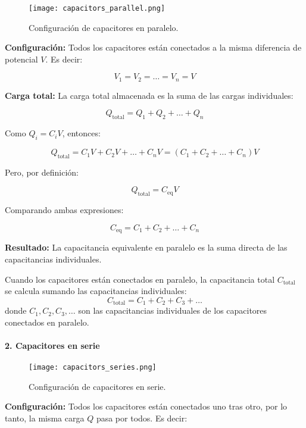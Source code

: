 \begin{figure}[ht]
    \centering
    \texttt{[image: capacitors\_parallel.png]}
    \caption{Configuración de capacitores en paralelo.}
    \label{fig:capacitors_parallel}    
\end{figure}

\textbf{Configuración:} Todos los capacitores están conectados a la misma diferencia de potencial \( V \). Es decir:

\[
V_1 = V_2 = \dots = V_n = V
\]

\textbf{Carga total:} La carga total almacenada es la suma de las cargas individuales:

\[
Q_{\text{total}} = Q_1 + Q_2 + \dots + Q_n
\]

Como \( Q_i = C_i V \), entonces:

\[
Q_{\text{total}} = C_1 V + C_2 V + \dots + C_n V = \left( C_1 + C_2 + \dots + C_n \right) V
\]

Pero, por definición:

\[
Q_{\text{total}} = C_{\text{eq}} V
\]

Comparando ambas expresiones:

\[
C_{\text{eq}} = C_1 + C_2 + \dots + C_n
\]

\textbf{Resultado:} La capacitancia equivalente en paralelo es la suma directa de las capacitancias individuales.

Cuando los capacitores están conectados en paralelo, la capacitancia total \( C_{\text{total}} \) se calcula sumando las capacitancias individuales:
\begin{equation}
    \boxed{C_{\text{total}} = C_1 + C_2 + C_3 + \ldots}
    \label{eq:capacitance_parallel}
\end{equation}
donde \( C_1, C_2, C_3, \ldots \) son las capacitancias individuales de los capacitores conectados en paralelo.

\paragraph{2. Capacitores en serie}

\begin{figure}[ht]
    \centering
    \texttt{[image: capacitors\_series.png]}
    \caption{Configuración de capacitores en serie.}
    \label{fig:capacitors_series}
\end{figure}

\textbf{Configuración:} Todos los capacitores están conectados uno tras otro, por lo tanto, la misma carga \( Q \) pasa por todos. Es decir:


